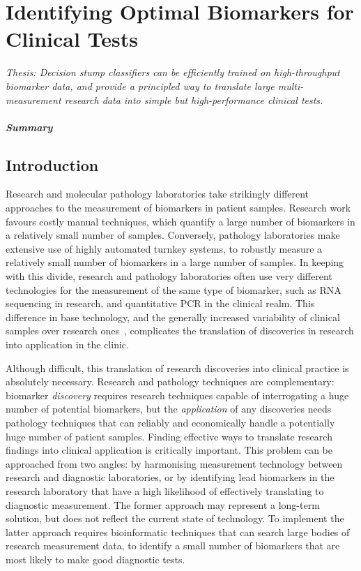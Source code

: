 \documentclass[dissertation.tex]{subfiles}
\begin{document}
\chapter[Identifying Optimal Biomarkers for Clinical Tests][Finding Optimal Biomarkers]{Identifying Optimal Biomarkers for Clinical Tests}
\label{chap:messina}


\emph{Thesis: Decision stump classifiers can be efficiently trained on high-throughput biomarker data, and provide a principled way to translate large multi-measurement research data into simple but high-performance clinical tests.}


\paragraph{Summary}


\section{Introduction}

Research and molecular pathology laboratories take strikingly different approaches to the measurement of biomarkers in patient samples.  Research work favours costly manual techniques, which quantify a large number of biomarkers in a relatively small number of samples.  Conversely, pathology laboratories make extensive use of highly automated turnkey systems, to robustly measure a relatively small number of biomarkers in a large number of samples.  In keeping with this divide, research and pathology laboratories often use very different technologies for the measurement of the same type of biomarker, such as RNA sequencing in research, and quantitative PCR in the clinical realm.  This difference in base technology, and the generally increased variability of clinical samples over research ones~\cite{Hewitt2008}, complicates the translation of discoveries in research into application in the clinic.

Although difficult, this translation of research discoveries into clinical practice is absolutely necessary.  Research and pathology techniques are complementary: biomarker \emph{discovery} requires research techniques capable of interrogating a huge number of potential biomarkers, but the \emph{application} of any discoveries needs pathology techniques that can reliably and economically handle a potentially huge number of patient samples.  Finding effective ways to translate research findings into clinical application is critically important.  This problem can be approached from two angles: by harmonising measurement technology between research and diagnostic laboratories, or by identifying lead biomarkers in the research laboratory that have a high likelihood of effectively translating to diagnostic measurement.  The former approach may represent a long-term solution, but does not reflect the current state of technology.  To implement the latter approach requires bioinformatic techniques that can search large bodies of research measurement data, to identify a small number of biomarkers that are most likely to make good diagnostic tests.
\end{document}
